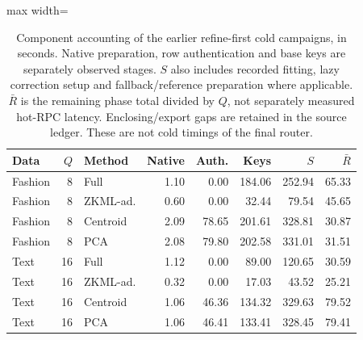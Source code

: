 \begin{table}[tbp]
\centering
\small
\caption{Component accounting of the earlier refine-first cold campaigns, in seconds. Native preparation, row authentication and base keys are separately observed stages. $S$ also includes recorded fitting, lazy correction setup and fallback/reference preparation where applicable. $\bar R$ is the remaining phase total divided by $Q$, not separately measured hot-RPC latency. Enclosing/export gaps are retained in the source ledger. These are not cold timings of the final router.}
\label{tab:ccd-components}
\begin{adjustbox}{max width=\textwidth}
\begin{tabular*}{.98\textwidth}{@{\extracolsep{\fill}}lrlrrrrr@{}}
\toprule
Data & $Q$ & Method & Native & Auth. & Keys & $S$ & $\bar R$\\
\midrule
Fashion & 8 & Full & 1.10 & 0.00 & 184.06 & 252.94 & 65.33\\
Fashion & 8 & ZKML-ad. & 0.60 & 0.00 & 32.44 & 79.54 & 45.65\\
Fashion & 8 & Centroid & 2.09 & 78.65 & 201.61 & 328.81 & 30.87\\
Fashion & 8 & PCA & 2.08 & 79.80 & 202.58 & 331.01 & 31.51\\
Text & 16 & Full & 1.12 & 0.00 & 89.00 & 120.65 & 30.59\\
Text & 16 & ZKML-ad. & 0.32 & 0.00 & 17.03 & 43.52 & 25.21\\
Text & 16 & Centroid & 1.06 & 46.36 & 134.32 & 329.63 & 79.52\\
Text & 16 & PCA & 1.06 & 46.41 & 133.41 & 328.45 & 79.41\\
\bottomrule
\end{tabular*}
\end{adjustbox}
\end{table}
